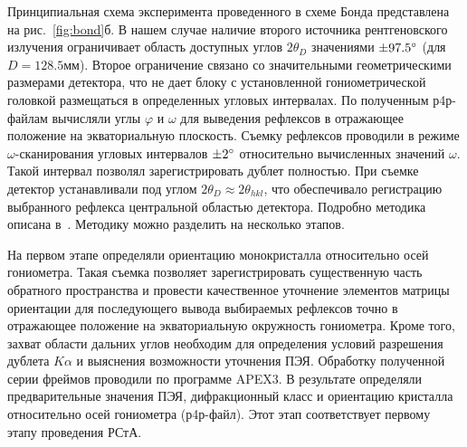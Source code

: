 Принципиальная схема эксперимента проведенного в схеме Бонда представлена на рис.~\ref{fig:bond}б.
В нашем случае наличие второго источника рентгеновского излучения ограничивает область доступных углов $2\theta_D$ значениями $\pm 97.5^\circ$ (для $D = 128.5\unit{мм}$).
Второе ограничение связано со значительными геометрическими размерами детектора, что не дает блоку с установленной гониометрической головкой размещаться в определенных угловых интервалах.
По полученным р4р-файлам вычисляли углы $\varphi$ и $\omega$ для выведения рефлексов в отражающее положение на экваториальную плоскость.
Съемку рефлексов проводили в режиме $\omega$-сканирования угловых интервалов $\pm 2^\circ$ относительно вычисленных значений $\omega$.
Такой интервал позволял зарегистрировать дублет полностью.
При съемке детектор устанавливали под углом $2\theta_D \approx 2\theta_{hkl}$, что обеспечивало регистрацию выбранного рефлекса центральной областью детектора.
Подробно методика описана в~\cite{Kudryavtsev:2024:YEu}.
Методику можно разделить на несколько этапов.

На первом этапе определяли ориентацию монокристалла относительно осей гониометра.
Такая съемка позволяет зарегистрировать существенную часть обратного пространства и провести качественное уточнение элементов матрицы ориентации для последующего вывода выбираемых рефлексов точно в отражающее положение на экваториальную окружность гониометра.
Кроме того, захват области дальних углов необходим для определения условий разрешения дублета $K\alpha$ и выяснения возможности уточнения ПЭЯ.
Обработку полученной серии фреймов проводили по программе APEX3.
В результате определяли предварительные значения ПЭЯ, дифракционный класс и ориентацию кристалла относительно осей гониометра (р4р-файл).
Этот этап соответствует первому этапу проведения РСтА.

